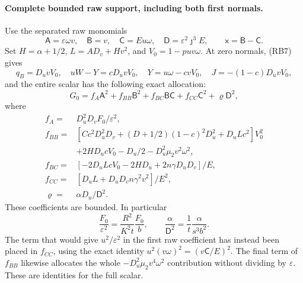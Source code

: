 \paragraph{Complete bounded raw support, including both first normals.}
Use the separated raw monomials
\[
 \mathsf A=\varepsilon\omega v,\quad
 \mathsf B=v,\quad \mathsf C=Eu\omega,\quad
 \mathsf D=\varepsilon^2\jmath^3E,
 \qquad \mathsf x=\mathsf B-\mathsf C.
 \tag{RI7}
\]
Set $H=\alpha+1/2$, $L=AD_v+Hv^2$, and $V_0=1-puv\omega$.
At zero normals, (RB7) gives
\[
 q_B=D_uvV_0,\quad uW-Y=cD_uvV_0,\quad
 Y=u\omega-cvV_0,\quad
 J=-(1-c)D_uvV_0,
\]
and the entire scalar has the following exact allocation:
\[
 G_0=f_A\mathsf A^2+f_{BB}\mathsf B^2+
 f_{BC}\mathsf B\mathsf C+f_{CC}\mathsf C^2+
 \varrho\mathsf D^2,                               \tag{RI8}
\]
where
\[
\begin{aligned}
 f_A={}&D_u^2D_vF_0/\varepsilon^2,\\
 f_{BB}={}&[Cc^2D_u^2D_v+(D+1/2)(1-c)^2D_u^2
                  +D_uLc^2]V_0^2\\
          &+2HD_ucV_0-D_u/2-D_u^2\mu_2v^2\omega^2,\\
 f_{BC}={}&[-2D_uLcV_0-2HD_u+2n\gamma D_uD_v]/E,\\
 f_{CC}={}&[D_uL+D_uD_vn\gamma^2v^2]/E^2,\\
 \varrho={}&\alpha D_u/\mathsf D^2.
\end{aligned}                                                      \tag{RI9}
\]
These coefficients are bounded. In particular
\[
 \frac{F_0}{\varepsilon^2}=
       \frac{R^2}{K^2t}\frac{F_0}{b},\qquad
 \frac{\alpha}{\mathsf D^2}=
       \frac1t\frac{\alpha}{s^3b^2}.
 \tag{RI10}
\]
The term that would give $u^2/\varepsilon^2$ in the first raw
coefficient has instead been placed in $f_{CC}$, using the exact
identity $u^2(v\omega)^2=(v\mathsf C/E)^2$.
The final term of $f_{BB}$ likewise allocates the whole
$-D_u^2\mu_2v^4\omega^2$ contribution without dividing by
$\varepsilon$. These are identities for the full scalar.

